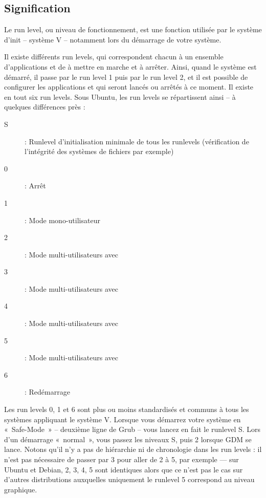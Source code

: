 \subsection{Signification}
Le run level, ou niveau de fonctionnement, est une fonction utilisée par le système d'init -- système V -- notamment lors du démarrage de votre système.\par
Il existe différents run levels, qui correspondent chacun à un ensemble d'applications et de  à mettre en marche et à arrêter. Ainsi, quand le système est démarré, il passe par le run level 1 puis par le run level 2, et il est possible de configurer les applications et  qui seront lancés ou arrêtés à ce moment. Il existe en tout six run levels. Sous Ubuntu, les run levels se répartissent ainsi -- à quelques différences près  :
\begin{description}
\item[S] : Runlevel d'initialisation minimale de tous les runlevels (vérification de l'intégrité des systèmes de fichiers par exemple) 
\item[0] : Arrêt 
\item[1] : Mode mono-utilisateur 
\item[2] : Mode multi-utilisateurs avec 
\item[3] : Mode multi-utilisateurs avec  
\item[4] : Mode multi-utilisateurs avec 
\item[5] : Mode multi-utilisateurs avec 
\item[6] : Redémarrage 
\end{description}
Les run levels 0, 1 et 6 sont plus ou moins standardisés et communs à tous les systèmes appliquant le système V. Lorsque vous démarrez votre système en «~Safe-Mode~» -- deuxième ligne de Grub -- vous lancez en fait le runlevel S. Lors d'un démarrage «~normal~», vous passez les niveaux S, puis 2 lorsque GDM se lance. Notons qu'il n'y a pas de hiérarchie ni de chronologie dans les run levels : il n'est pas nécessaire de passer par 3 pour aller de 2 à 5, par exemple --- sur Ubuntu et Debian, 2, 3, 4, 5 sont identiques alors que ce n'est pas le cas sur d'autres distributions auxquelles uniquement le runlevel 5 correspond au niveau graphique.\\
